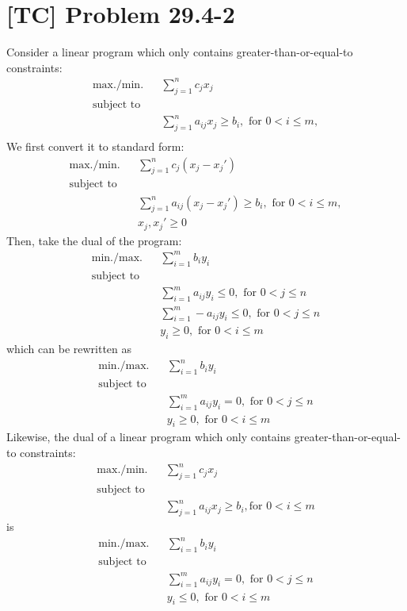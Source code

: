 \documentclass[a4paper,11pt,twocolumn]{article}
\begin{document}
  \section{[TC] Problem 29.4-2}
  Consider a linear program which only contains greater-than-or-equal-to constraints:
  \begin{align*}
    \text{max./min.} && \sum_{j = 1}^{n} c_j x_j \\
    \text{subject to} \\
    && \sum_{j = 1}^{n} a_{ij} x_j \geq b_i, \text{ for } 0 < i \leq m, \\
  \end{align*}
  We first convert it to standard form:
  \begin{align*}
    \text{max./min.} && \sum_{j = 1}^{n} c_j (x_j - x_j') \\
    \text{subject to} \\
    && \sum_{j = 1}^{n} a_{ij} (x_j - x_j') \geq b_i, \text{ for } 0 < i \leq m, \\
    && x_j, x_j' \geq 0
  \end{align*}
  Then, take the dual of the program:
  \begin{align*}
    \text{min./max.} && \sum_{i = 1}^{m} b_iy_i \\
    \text{subject to} \\
    && \sum_{i = 1}^{m} a_{ij} y_i \leq 0, \text{ for } 0 < j \leq n \\
    && \sum_{i = 1}^{m} -a_{ij} y_i \leq 0, \text{ for } 0 < j \leq n \\
    && y_i \geq 0, \text{ for } 0 < i \leq m
  \end{align*}
  which can be rewritten as
  \begin{align*}
    \text{min./max.} && \sum_{i = 1}^{n} b_iy_i \\
    \text{subject to} \\
    && \sum_{i = 1}^{m} a_{ij} y_i = 0, \text{ for } 0 < j \leq n \\
    && y_i \geq 0, \text{ for } 0 < i \leq m
  \end{align*}
  Likewise, the dual of a linear program which only contains greater-than-or-equal-to constraints:
  \begin{align*}
    \text{max./min.} && \sum_{j = 1}^{n} c_j x_j \\
    \text{subject to} \\
    && \sum_{j = 1}^{n} a_{ij} x_j \geq b_i, \text{for } 0 < i \leq m \end{align*}
  is
  \begin{align*}
    \text{min./max.} && \sum_{i = 1}^{n} b_iy_i \\
    \text{subject to} \\
    && \sum_{i = 1}^{m} a_{ij} y_i = 0 , \text{ for } 0 < j \leq n \\
    && y_i \leq 0, \text{ for } 0 < i \leq m
  \end{align*}
\end{document}
